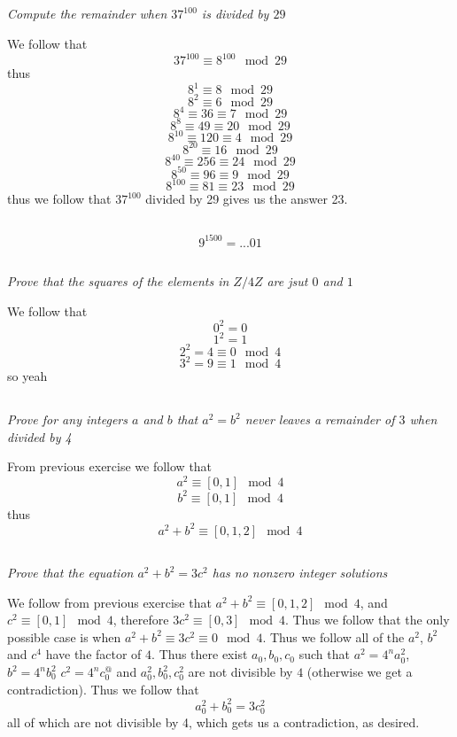 \documentclass[11pt,oneside,titlepage]{book}
\begin{document}
\subsection{}

\textit{Compute the remainder when $37^{100}$ is divided by $29$}

We follow that 
$$37^{100} \equiv 8^{100} \mod {29}$$
thus
$$8^ 1 \equiv 8 \mod{29}$$
$$8^ 2 \equiv 6 \mod{29}$$
$$8^ 4 \equiv 36 \equiv 7 \mod{29}$$
$$8^{8} \equiv 49 \equiv 20 \mod{29}$$
$$8^{10} \equiv 120 \equiv 4 \mod{29}$$
$$8^{20} \equiv 16 \mod{29}$$
$$8^{40} \equiv 256 \equiv 24 \mod{29}$$
$$8^{50} \equiv 96 \equiv 9 \mod{29}$$
$$8^{100} \equiv 81 \equiv 23 \mod{29}$$
thus we follow that $37^{100}$ divided by 29 gives us the answer 23.

\subsection{}

$$9^{1500} = ...01$$

\subsection{}

\textit{Prove that the squares of the elements in $Z/4Z$ are jsut $0$ and $1$}

We follow that
$$0^2 = 0$$
$$1^2 = 1$$
$$2^2 = 4 \equiv 0 \mod 4 $$
$$3^2 = 9 \equiv 1\mod 4 $$
so yeah

\subsection{}

\textit{Prove for any integers $a$ and $b$ that $a^2 = b^2$ never leaves a remainder of $3$
  when divided by 4}

From previous exercise we follow that
$$a^2 \equiv [0, 1] \mod 4$$
$$b^2 \equiv [0, 1] \mod 4$$
thus
$$a^2 + b^2  \equiv [0, 1, 2] \mod 4$$

\subsection{}

\textit{Prove that the equation $a^2 + b^2 = 3c^2$ has no nonzero integer solutions}

We follow from previous exercise that $a^2 + b^2 \equiv [0, 1, 2] \mod 4$, and
$c^2 \equiv [0, 1] \mod 4$, therefore $3c^2 \equiv [0, 3] \mod 4$. Thus we follow that
the only possible case is when $a^2 + b^2 \equiv 3c^2 \equiv 0 \mod 4$. Thus we follow
all of the $a^2$, $b^2$ and $c^4$ have the factor of $4$. Thus there exist
$a_0, b_0, c_0$ such that $a^2 = 4^n a_0^2$, $b^2 = 4^n b_0^2$ $c^2 = 4^n c_0^@$
and $a_0^2, b_0^2, c_0^2$ are not divisible by $4$ (otherwise we get a contradiction).
Thus we follow that
$$a_0^2 +  b_0^2 = 3c_0^2$$
all of which are not divisible by 4, which gets us a contradiction, as desired.
\end{document}
